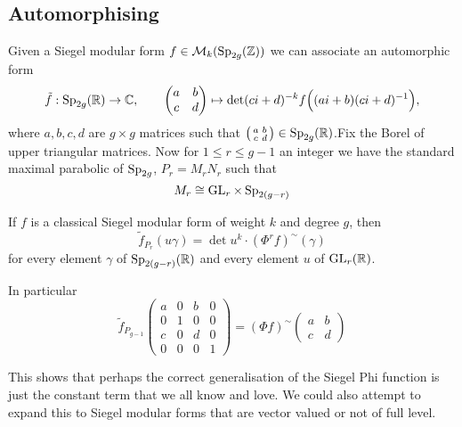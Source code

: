 \subsection{Automorphising}
Given a Siegel modular form \(f\in \mathcal{M}_k(\Sp_{2g}(\Z))\) we can associate an automorphic form
\[\tilde{f} : \Sp_{2g}(\R)\to\C, \qquad \begin{pmatrix} a & b\\ c & d\end{pmatrix}\mapsto \det(ci+d)^{-k} f\Bigl((ai+b)(ci+d)\inv\Bigr), \]
where \(a,b,c,d\) are \(g\times g\) matrices such that \(\bigl(\begin{smallmatrix} a & b\\ c & d\end{smallmatrix}\bigr)\in\Sp_{2g}(\R)\).Fix the Borel of upper triangular matrices. Now for \(1\leq r\leq g-1\) an integer we have the standard maximal parabolic of \(\operatorname{Sp}_{2g}\), \(P_r = M_rN_r\) such that 
\[M_r \cong \operatorname{GL}_r\times \operatorname{Sp}_{2(g-r)}\]

\begin{Theorem}[Zhang]
	If \(f\) is a classical Siegel modular form of weight \(k\) and degree \(g\), then
	\begin{equation} 
		\tilde f_{P_r}(u\gamma) = \det u^k\cdot (\Phi^{r} f)^\sim(\gamma)
	\end{equation}
	for every element \(\gamma\) of \(\Sp_{2(g-r)}(\R)\) and every element \(u\) of \(\GL_{r}(\R)\).

 In particular 
 \[\tilde{f}_{P_{g-1}}\begin{pmatrix} a & 0 & b & 0\\ 0 & 1 & 0 & 0\\ c & 0 & d & 0\\ 0 & 0 & 0 & 1\end{pmatrix} = (\Phi f)^\sim\begin{pmatrix}
     a & b\\
     c& d
 \end{pmatrix}\]
\end{Theorem}

This shows that perhaps the correct generalisation of the Siegel Phi function is just the constant term that we all know and love. We could also attempt to expand this to Siegel modular forms that are vector valued or not of full level. 

